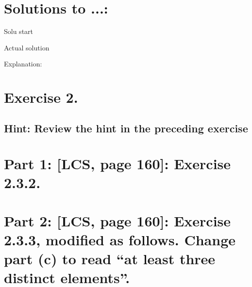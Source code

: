 \documentclass{article}
\begin{document}
\section*{Solutions to ...:}

\vspace{1em}

Solu start

\vspace{1em}

Actual solution

\vspace{1em}


Explanation:
   

\newpage

\section*{Exercise 2.}

\subsection*{Hint: Review the hint in the preceding exercise}



\begin{mdframed}
\end{mdframed}

\section*{Part 1: [LCS, page 160]: Exercise 2.3.2. }


\vspace{1em}


\vspace{1em}

\newpage

\section*{Part 2: [LCS, page 160]: Exercise 2.3.3, modified as follows. Change part (c) to read “at least three
distinct elements”.}


\vspace{1em}


\vspace{1em}

\newpage
\end{document}
